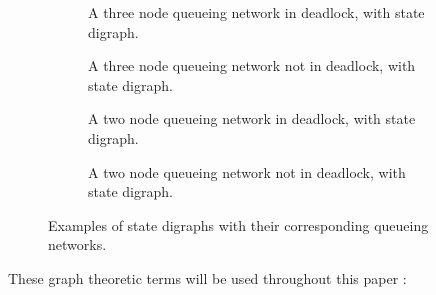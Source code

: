 \documentclass{article}
\numberwithin{equation}{section}
\begin{document}
\begin{figure}[!htbp]
\begin{center}
  \begin{subfigure}{0.45\textwidth}
    \begin{center}
      
    \end{center}
    \caption{A three node queueing network in deadlock, with state digraph.}
    \label{fig:exampledigraph_deadlock}
  \end{subfigure}
  \hspace{6 mm}
  \begin{subfigure}{0.45\textwidth}
    \begin{center}
      
    \end{center}
    \caption{A three node queueing network not in deadlock, with state
    digraph.}
    \label{fig:exampledigraph_nodeadlock}
    \vspace{6 mm}
  \end{subfigure}
  \begin{subfigure}{0.45\textwidth}
    \begin{center}
      
    \end{center}
    \caption{A two node queueing network in deadlock, with state digraph.}
    \label{fig:exampledigraph2_deadlock}
  \end{subfigure}
  \hspace{6 mm}
  \begin{subfigure}{0.45\textwidth}
    \begin{center}
      
    \end{center}
    \caption{A two node queueing network not in deadlock, with state digraph.}
    \label{fig:exampledigraph2_nodeadlock}
    \vspace{6 mm}
  \end{subfigure}
  \end{center}
  \caption{Examples of state digraphs with their corresponding queueing
  networks.}
  \label{fig:exampledigraphs}
\end{figure}

These graph theoretic terms will be used throughout this paper
\cite{gibbons85, wilson70}:
\end{document}
